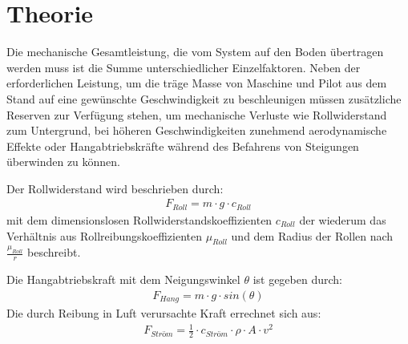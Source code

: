\chapter{Theorie}
	Die mechanische Gesamtleistung, die vom System auf den Boden übertragen werden muss ist die Summe unterschiedlicher Einzelfaktoren.
	Neben der erforderlichen Leistung, um die träge Masse von Maschine und Pilot aus dem Stand auf eine gewünschte Geschwindigkeit zu beschleunigen müssen zusätzliche Reserven zur Verfügung stehen, um mechanische Verluste wie Rollwiderstand zum Untergrund, bei höheren Geschwindigkeiten zunehmend aerodynamische Effekte oder Hangabtriebskräfte während des Befahrens von Steigungen überwinden zu können.\par
	Der Rollwiderstand wird beschrieben durch:
	\begin{align}
		F_{Roll} = m \cdot g \cdot c_{Roll}
		\label{eq:rolling resistance}
	\end{align}
	mit dem dimensionslosen Rollwiderstandskoeffizienten \(c_{Roll}\) der wiederum das Verhältnis aus Rollreibungskoeffizienten \(\mu_{Roll}\) und dem Radius der Rollen nach \(\frac{\mu_{Roll}}{r}\) beschreibt.\par\medskip
	Die Hangabtriebskraft mit dem Neigungswinkel \(\theta\) ist gegeben durch:
	\begin{align}
		F_{Hang} = m \cdot g \cdot sin\left(\theta\right)
		\label{eq:downhill force}
	\end{align}
	Die durch Reibung in Luft verursachte Kraft errechnet sich aus:
	\begin{align}
		F_{Ström} = \frac{1}{2} \cdot c_{Ström} \cdot \rho \cdot A \cdot v^2
		\label{eq:air drag}
	\end{align}

